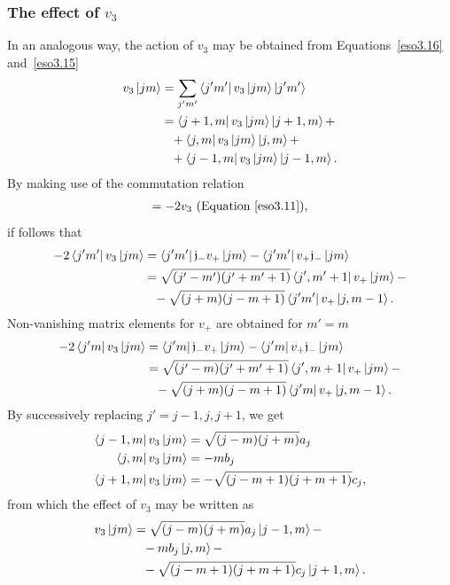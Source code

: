 \documentclass[12pt,a4paper]{report}
\theoremstyle{definition}
\theoremstyle{remark}
\theoremstyle{remark}
\begin{document}
\subsubsection{The effect of $v_3$}
In an analogous way, the action of $v_3$ may be obtained from Equations~\ref{eso3.16} and~\ref{eso3.15}
\begin{align*}
v_3\ket{jm}&=\sum_{j'm'}\bra{j'm'}v_3\ket{jm}\ket{j'm'}\\
&=\bra{j+1,m}v_3\ket{jm}\ket{j+1,m}+\\
&\phantom{=}+\bra{j,m}v_3\ket{jm}\ket{j,m}+\\
&\phantom{=}+\bra{j-1,m}v_3\ket{jm}\ket{j-1,m}.
\end{align*}
By making use of the commutation relation
\begin{align*}
[\mathfrak{j}_-,v_+]=-2v_3 \text{ (Equation~\ref{eso3.11})},
\end{align*}
if follows that
\begin{align*}
-2\bra{j'm'}v_3\ket{jm}&=\bra{j'm'}\mathfrak{j}_-v_+\ket{jm}-\bra{j'm'}v_+\mathfrak{j}_-\ket{jm}\\
&=\sqrt{(j'-m')(j'+m'+1)}\bra{j',m'+1}v_+\ket{jm}-\\
&\phantom{=}-\sqrt{(j+m)(j-m+1)}\bra{j'm'}v_+\ket{j,m-1}.
\end{align*}
Non-vanishing matrix elements for $v_+$ are obtained for $m'=m$
\begin{align*}
-2\bra{j'm}v_3\ket{jm}&=\bra{j'm}\mathfrak{j}_-v_+\ket{jm}-\bra{j'm}v_+\mathfrak{j}_-\ket{jm}\\
&=\sqrt{(j'-m)(j'+m'+1)}\bra{j',m+1}v_+\ket{jm}-\\
&\phantom{=}-\sqrt{(j+m)(j-m+1)}\bra{j'm}v_+\ket{j,m-1}.
\end{align*}
By successively replacing $j'=j-1,j,j+1$, we get
\begin{align*}
\bra{j-1,m}v_3\ket{jm}&=\sqrt{(j-m)(j+m)}a_j\\
\bra{j,m}v_3\ket{jm}&=-mb_j\\
\bra{j+1,m}v_3\ket{jm}&=-\sqrt{(j-m+1)(j+m+1)}c_j,
\end{align*}
from which the effect of $v_3$ may be written as
\begin{equation}\label{eso3.18}
\begin{aligned}
v_3\ket{jm}&=\sqrt{(j-m)(j+m)}a_j\ket{j-1,m}-\\
&\phantom{=}-mb_j\ket{j,m}-\\
&\phantom{=}-\sqrt{(j-m+1)(j+m+1)}c_j\ket{j+1,m}.
\end{aligned}
\end{equation}
\end{document}
